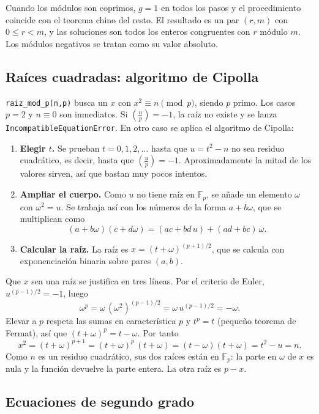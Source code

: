 \documentclass[11pt,a4paper]{article}
\newcommand{\code}[1]{\texttt{#1}}
\begin{document}
Cuando los módulos son coprimos, $g=1$ en todos los pasos y el procedimiento coincide con el teorema chino del resto. El resultado es un par $(r,m)$ con $0\le r<m$, y las soluciones son todos los enteros congruentes con $r$ módulo $m$. Los módulos negativos se tratan como su valor absoluto.

\subsection{Raíces cuadradas: algoritmo de Cipolla}

\code{raiz\_mod\_p(n,p)} busca un $x$ con $x^2\equiv n \pmod p$, siendo $p$ primo. Los casos $p=2$ y $n\equiv0$ son inmediatos. Si $\left(\frac{n}{p}\right)=-1$, la raíz no existe y se lanza \code{IncompatibleEquationError}. En otro caso se aplica el algoritmo de Cipolla:

\begin{enumerate}
\item \textbf{Elegir $t$.} Se prueban $t=0,1,2,\dots$ hasta que $u=t^2-n$ no sea residuo cuadrático, es decir, hasta que $\left(\frac{u}{p}\right)=-1$. Aproximadamente la mitad de los valores sirven, así que bastan muy pocos intentos.
\item \textbf{Ampliar el cuerpo.} Como $u$ no tiene raíz en $\mathbb{F}_p$, se añade un elemento $\omega$ con $\omega^2=u$. Se trabaja así con los números de la forma $a+b\omega$, que se multiplican como
\[
(a+b\omega)(c+d\omega)=(ac+bd\,u)+(ad+bc)\,\omega .
\]
\item \textbf{Calcular la raíz.} La raíz es $x=(t+\omega)^{(p+1)/2}$, que se calcula con exponenciación binaria sobre pares $(a,b)$.
\end{enumerate}

Que $x$ sea una raíz se justifica en tres líneas. Por el criterio de Euler, $u^{(p-1)/2}=-1$, luego
\[
\omega^p=\omega\,(\omega^2)^{(p-1)/2}=\omega\,u^{(p-1)/2}=-\omega .
\]
Elevar a $p$ respeta las sumas en característica $p$ y $t^p=t$ (pequeño teorema de Fermat), así que $(t+\omega)^p=t-\omega$. Por tanto
\[
x^2=(t+\omega)^{p+1}=(t+\omega)^p\,(t+\omega)=(t-\omega)(t+\omega)=t^2-u=n .
\]
Como $n$ es un residuo cuadrático, sus dos raíces están en $\mathbb{F}_p$: la parte en $\omega$ de $x$ es nula y la función devuelve la parte entera. La otra raíz es $p-x$.

\subsection{Ecuaciones de segundo grado}
\end{document}
